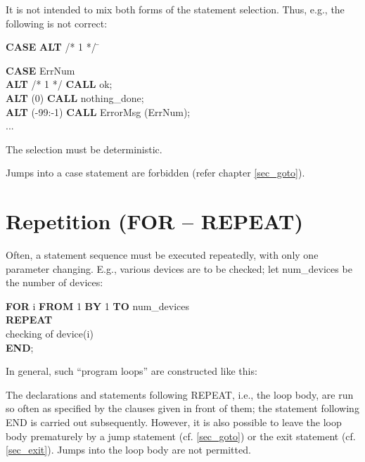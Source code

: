 It is not intended to mix both forms of the statement selection. Thus,
e.g., the following is not correct:

\begin{tabbing}
{\bf CASE} \= {\bf ALT} /* 1 */ \= \kill

{\bf CASE} \> ErrNum \> \\
    \> {\bf ALT} /* 1 */  \> {\bf CALL} ok;\\
    \> {\bf ALT} (0)      \> {\bf CALL} nothing\_done;\\
    \> {\bf ALT} (-99:-1) \> {\bf CALL} ErrorMsg (ErrNum);\\
    \> ... \>
\end{tabbing}

The selection must be deterministic.

Jumps into a case statement are forbidden (refer chapter \ref{sec_goto}).

\section{Repetition (FOR -- REPEAT)}   %

Often, a statement sequence must be executed repeatedly, with only one
parameter changing. E.g., various devices are to be checked; let
num\_devices be the number of devices:

{\bf FOR} i {\bf FROM} 1 {\bf BY} 1 {\bf TO} num\_devices\\
{\bf REPEAT}\\
\x checking of device(i)\\
{\bf END};

In general, such ``program loops'' are constructed like this:


The declarations and statements following REPEAT, i.e., the loop body,
are run so often as specified by the clauses given in front of them; the
statement following END is carried out subsequently. However, it is also
possible to leave the loop body prematurely by a jump statement (cf. \ref{sec_goto})
or the exit statement (cf. \ref{sec_exit}). Jumps into the loop body are not permitted.

